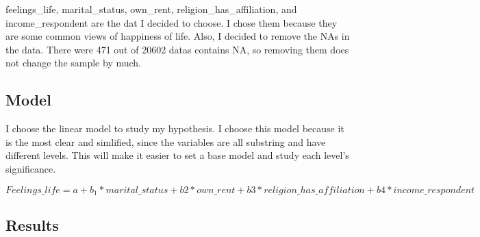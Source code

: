 \documentclass[]{article}
\begin{document}
feelings\_life, marital\_status, own\_rent, religion\_has\_affiliation,
and income\_respondent are the dat I decided to choose. I chose them
because they are some common views of happiness of life. Also, I decided
to remove the NAs in the data. There were 471 out of 20602 datas
contains NA, so removing them does not change the sample by much.

\hypertarget{model}{%
\subsection{Model}\label{model}}

I choose the linear model to study my hypothesis. I choose this model
because it is the most clear and simlified, since the variables are all
substring and have different levels. This will make it easier to set a
base model and study each level's significance.

\[Feelings\_life = a + b_1*marital\_status+ b2 *own\_rent + b3*religion\_has\_affiliation +b4*income\_respondent\]

\hypertarget{results}{%
\subsection{Results}\label{results}}
\end{document}
